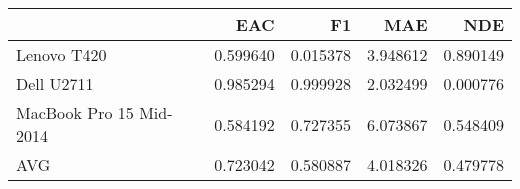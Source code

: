 \begin{tabular}{lrrrr}
\toprule
{} &       EAC &        F1 &       MAE &       NDE \\
\midrule
Lenovo T420             &  0.599640 &  0.015378 &  3.948612 &  0.890149 \\
Dell U2711              &  0.985294 &  0.999928 &  2.032499 &  0.000776 \\
MacBook Pro 15 Mid-2014 &  0.584192 &  0.727355 &  6.073867 &  0.548409 \\
AVG                     &  0.723042 &  0.580887 &  4.018326 &  0.479778 \\
\bottomrule
\end{tabular}
